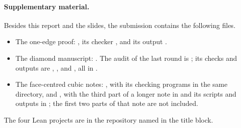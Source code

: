 \documentclass[11pt,letterpaper]{article}
\theoremstyle{definition}
\theoremstyle{remark}
\begin{document}
\paragraph{Supplementary material.}
Besides this report and the slides, the submission contains the following files.
\begin{itemize}
  \item The one-edge proof: , its checker
    , and its output
    .
  \item The diamond manuscript:
    .
    The audit of the last round is ; its checks
    and outputs are , ,
     and , all in
    .
  \item The face-centred cubic notes: , with its
    checking programs in the same directory, and , with the
    third part of a longer note in  and its scripts and outputs in
    ; the first two parts of that note are not included.
\end{itemize}
The four Lean projects are in the repository named in the title block.
\end{document}
